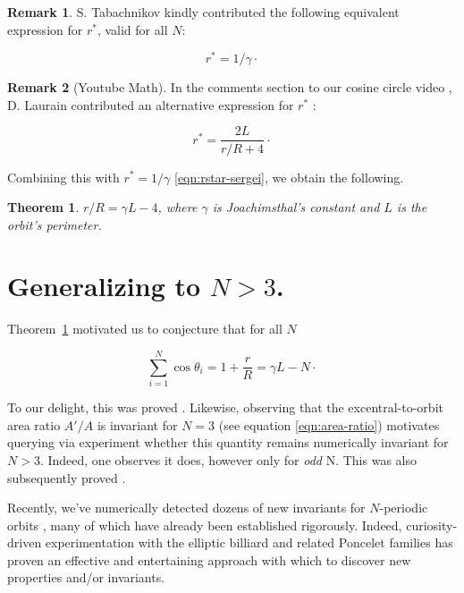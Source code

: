 \documentclass{article}
\newtheorem{theorem}{Theorem}
\theoremstyle{definition}
\newtheorem{remark}{Remark}
\begin{document}
\begin{remark}
S. Tabachnikov kindly contributed 
\cite{reznik2019-intelligencer} the following equivalent expression for $r^*$, valid for all $N$:

\begin{equation}
    r^* = 1/\gamma\cdot
\label{eqn:rstar-sergei}
\end{equation}
\end{remark}

\begin{remark}[Youtube Math]

In the comments section to our cosine circle video \cite[PL\#05]{reznik2020-playlist-proofs}, D. Laurain contributed an alternative expression for $r^*$ \cite{dominique19}:

\begin{equation}
    r^* = \frac{2 L}{r/R+4}\cdot
    \label{eqn:rstar-laurain}
\end{equation}
\end{remark}

\noindent Combining this with $r^*=1/\gamma$ \eqref{eqn:rstar-sergei}, we obtain the following.

\begin{theorem}
${r/R}={\gamma}L-4$, where $\gamma$ is Joachimsthal's constant and $L$ is the orbit's perimeter.
\label{thm:rovR-explicit}
\end{theorem}

\section{Generalizing to $N>3$.}
\label{sec:gener}
Theorem~\ref{thm:rovR-explicit} motivated us to conjecture that for all $N$

\begin{equation*}
\sum_{i=1}^{N}{\cos\theta_i}=1+\frac{r}{R}=\gamma L - N\cdot
\end{equation*}

\noindent To our delight, this was proved \cite{akopyan2020-invariants,bialy2020-invariants}. Likewise, observing that the excentral-to-orbit area ratio $A'/A$ is invariant for $N=3$ (see equation \eqref{eqn:area-ratio}) motivates querying via experiment whether this quantity remains numerically invariant for $N>3$. Indeed, one observes it does, however only for {\em odd} N. This was also subsequently proved \cite{akopyan2020-invariants}.

Recently, we've numerically detected dozens of new invariants for $N$-periodic orbits \cite{reznik2020-forty-invariants}, many of which have already been   established rigorously. Indeed, curiosity-driven experimentation with the elliptic billiard and related Poncelet families has proven an effective and entertaining approach with which to discover new properties and/or invariants.
\end{document}
